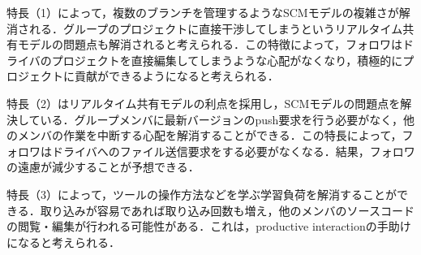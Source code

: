 特長（1）によって，複数のブランチを管理するようなSCMモデルの複雑さが解消される．グループのプロジェクトに直接干渉してしまうというリアルタイム共有モデルの問題点も解消されると考えられる．この特徴によって，フォロワはドライバのプロジェクトを直接編集してしまうような心配がなくなり，積極的にプロジェクトに貢献ができるようになると考えられる．

特長（2）はリアルタイム共有モデルの利点を採用し，SCMモデルの問題点を解決している．グループメンバに最新バージョンのpush要求を行う必要がなく，他のメンバの作業を中断する心配を解消することができる．この特長によって，フォロワはドライバへのファイル送信要求をする必要がなくなる．結果，フォロワの遠慮が減少することが予想できる．

特長（3）によって，ツールの操作方法などを学ぶ学習負荷を解消することができる．取り込みが容易であれば取り込み回数も増え，他のメンバのソースコードの閲覧・編集が行われる可能性がある．これは，productive interactionの手助けになると考えられる．